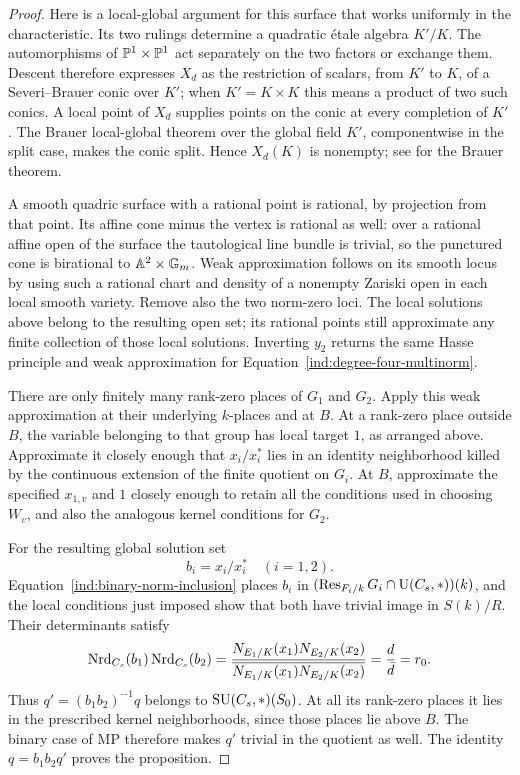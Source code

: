 \begin{proof}
Here is a local-global argument for this surface that works
uniformly in the characteristic.  Its two rulings determine
a quadratic \'etale algebra $K'/K$.  The automorphisms of
$\mathbb P^1\times\mathbb P^1$ act separately on the two factors or
exchange them.  Descent therefore expresses $X_d$ as the
restriction of scalars, from $K'$ to $K$, of a Severi--Brauer
conic over $K'$; when $K'=K\times K$ this means a product of
two such conics.  A local point of $X_d$ supplies points on
the conic at every completion of $K'$.  The Brauer
local-global theorem over the global field $K'$, componentwise
in the split case, makes the conic split.  Hence $X_d(K)$ is
nonempty; see \cite{MilneCFT} for the Brauer theorem.

A smooth quadric surface with a rational point is rational,
by projection from that point.  Its affine cone minus the
vertex is rational as well: over a rational affine open of
the surface the tautological line bundle is trivial, so the
punctured cone is birational to $\mathbb A^2\times\mathbb G_m$.
Weak approximation follows on its smooth locus by using such
a rational chart and density of a nonempty Zariski open in
each local smooth variety.  Remove also the two norm-zero
loci.  The local solutions above belong to the resulting
open set; its rational points still approximate any finite
collection of those local solutions.  Inverting $y_2$ returns
the same Hasse principle and weak approximation for
Equation~\eqref{ind:degree-four-multinorm}.

There are only finitely many rank-zero places of $G_1$ and
$G_2$.  Apply this weak approximation at their underlying
$k$-places and at $B$.  At a rank-zero place outside $B$,
the variable belonging to that group has local target $1$,
as arranged above.  Approximate it closely enough that
$x_i/x_i^*$ lies in an identity neighborhood killed by the
continuous extension of the finite quotient on $G_i$.
At $B$, approximate the specified $x_{1,v}$ and $1$ closely
enough to retain all the conditions used in choosing $W_v$,
and also the analogous kernel conditions for $G_2$.

For the resulting global solution set
\[
 b_i=x_i/x_i^*\quad(i=1,2).
\]
Equation~\eqref{ind:binary-norm-inclusion} places $b_i$ in
$(\operatorname{Res}_{F_i/k}G_i\cap\operatorname{U}(C_s,*))(k)$, and the local conditions just imposed
show that both have trivial image in $S(k)/R$.
Their determinants satisfy
\[
 \operatorname{Nrd}_{C_s}(b_1)\operatorname{Nrd}_{C_s}(b_2)
 =\frac{N_{E_1/K}(x_1)N_{E_2/K}(x_2)}
        {\overline{N_{E_1/K}(x_1)N_{E_2/K}(x_2)}}
 =\frac d{\bar d}=r_0.
\]
Thus $q'=(b_1b_2)^{-1}q$ belongs to $\operatorname{SU}(C_s,*)(S_0)$.
At all its rank-zero places it lies in the prescribed kernel
neighborhoods, since those places lie above $B$.
The binary case of MP therefore makes $q'$ trivial in the
quotient as well.  The identity $q=b_1b_2q'$ proves the
proposition.
\end{proof}


